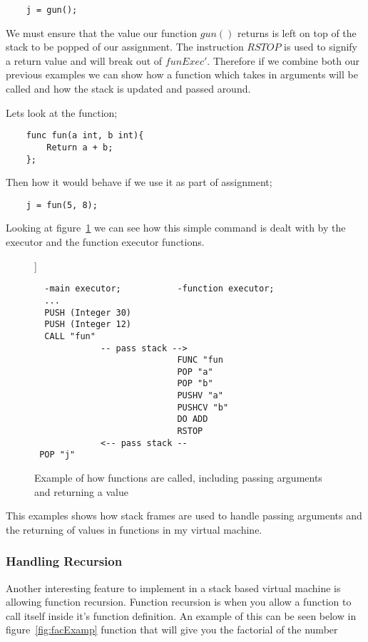 \begin{lstlisting}
	j = gun();
\end{lstlisting} 

We must ensure that the value our function $gun()$ returns is left on top of the stack to be popped of our assignment. The instruction $RSTOP$ is used to signify a return value and will break out of $funExec'$. Therefore if we combine both our previous examples we can show how a function which takes in arguments will be called and how the stack is updated and passed around.

Lets look at the function;

\begin{lstlisting}
	func fun(a int, b int){
		Return a + b;
	};
\end{lstlisting}

Then how it would behave if we use it as part of assignment;

\begin{lstlisting}
	j = fun(5, 8);
\end{lstlisting}

Looking at figure~\ref{fig:stackFrame} we can see how this simple command is dealt with by the executor and the function executor functions. 

\begin{figure}[h]]
\centering
\begin{lstlisting}
  -main executor;           -function executor;
  ...
  PUSH (Integer 30)
  PUSH (Integer 12)
  CALL "fun"
             -- pass stack --> 
                            FUNC "fun  
                            POP "a"
                            POP "b"
                            PUSHV "a"
                            PUSHCV "b"
                            DO ADD
                            RSTOP
             <-- pass stack --
 POP "j"                               
\end{lstlisting}
\caption{Example of how functions are called, including passing arguments and returning a value}
\label{fig:stackFrame}
\end{figure}

This examples shows how stack frames are used to handle passing arguments and the returning of values in functions in my virtual machine.

\subsubsection{Handling Recursion}

Another interesting feature to implement in a stack based virtual machine is allowing function recursion. Function recursion is when you allow a function to call itself inside it's function definition. An example of this can be seen below in figure~\ref{fig:facExamp} function that will give you the factorial of the number  

